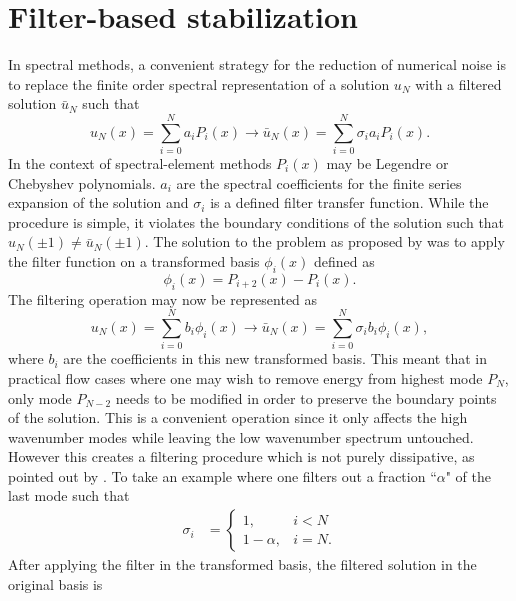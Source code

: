 \section{Filter-based stabilization}

In spectral methods, a convenient strategy for the reduction of numerical noise is to replace the finite order spectral representation of a solution $u_{N}$ with a filtered solution $\bar{u}_{N}$ such that
\begin{equation}
	u_{N}(x) = \sum_{i=0}^{N}a_{i}P_{i}(x) \rightarrow \bar{u}_{N}(x) = \sum_{i=0}^{N}\sigma_{i}a_{i}P_{i}(x).
	\label{eqn:generic_filter}
\end{equation}
In the context of spectral-element methods $P_{i}(x)$ may be Legendre or Chebyshev polynomials. $a_{i}$ are the spectral coefficients for the finite series expansion of the solution and $\sigma_{i}$ is a defined filter transfer function. While the procedure is simple, it violates the boundary conditions of the solution such that $u_{N}(\pm1) \neq \bar{u}_{N}(\pm1)$. The solution to the problem as proposed by \cite{boyd98} was to apply the filter function on a transformed basis $\phi_{i}(x)$ defined as
\begin{equation}
	\phi_{i}(x) = P_{i+2}(x) - P_{i}(x).
	\label{eqn:boyd}
\end{equation}
The filtering operation may now be represented as
\begin{equation}
	u_{N}(x) = \sum_{i=0}^{N}b_{i}\phi_{i}(x) \rightarrow \bar{u}_{N}(x) = \sum_{i=0}^{N}\sigma_{i}b_{i}\phi_{i}(x),
\end{equation}
where $b_{i}$ are the coefficients in this new transformed basis. This meant that in practical flow cases where one may wish to remove energy from highest mode $P_{N}$, only mode $P_{N-2}$ needs to be modified in order to preserve the boundary points of the solution. This is a convenient operation since it only affects the high wavenumber modes while leaving the low wavenumber spectrum untouched. However this creates a filtering procedure which is not purely dissipative, as pointed out by \cite{pasquetti02,fischer01}. To take an example where one filters out a fraction ``$\alpha$" of the last mode such that
\begin{align}
\sigma_{i} &=
	\begin{cases}
		1, & i<N \\
		1 - \alpha, & i=N.
	\end{cases}
\end{align}
After applying the filter in the transformed basis, the filtered solution in the original basis is
